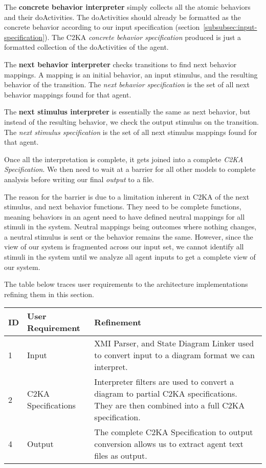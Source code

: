 \documentclass[11pt]{article}
\begin{document}
    The \textbf{concrete behavior interpreter} simply collects all the atomic behaviors and their doActivities.
    The doActivities should already be formatted as the concrete behavior according to our input specification (section~\ref{subsubsec:input-specification}).
    The C2KA \textit{concrete behavior specification} produced is just a formatted collection of the doActivities of the agent.

    The \textbf{next behavior interpreter} checks transitions to find next behavior mappings.
    A mapping is an initial behavior, an input stimulus, and the resulting behavior of the transition.
    The \textit{next behavior specification} is the set of all next behavior mappings found for that agent.

    The \textbf{next stimulus interpreter} is essentially the same as next behavior,
    but instead of the resulting behavior, we check the output stimulus on the transition.
    The \textit{next stimulus specification} is the set of all next stimulus mappings found for that agent.

    Once all the interpretation is complete, it gets joined into a complete \textit{C2KA Specification}.
    We then need to wait at a barrier for all other models to complete analysis before writing our final \textit{output} to a file.

    The reason for the barrier is due to a limitation inherent in C2KA of the next stimulus, and next behavior functions.
    They need to be complete functions,
    meaning behaviors in an agent need to have defined neutral mappings for all stimuli in the system.
    Neutral mappings being outcomes where nothing changes, a neutral stimulus is sent or the behavior remains the same.
    However, since the view of our system is fragmented across our input set,
    we cannot identify all stimuli in the system until we analyze all agent inputs to get a complete view of our system.


    The table below traces user requirements to the architecture implementations refining them in this section.
    \begin{table}[htbp]
        \centering
        \begin{tabularx}{\textwidth}{| l | l | X |}
            \hline
            \textbf{ID} & \textbf{User Requirement} & \textbf{Refinement} \\
            \hline
            1 & Input & XMI Parser, and State Diagram Linker used to convert input to a diagram format we can interpret. \\ \hline
            2 & C2KA Specifications & Interpreter filters are used to convert a diagram to partial C2KA specifications.
            They are then combined into a full C2KA specification. \\ \hline
            4 & Output & The complete C2KA Specification to output conversion allows us to extract agent text files as output.  \\ \hline
        \end{tabularx}\label{tab:arch-description-table}
    \end{table}
\end{document}

